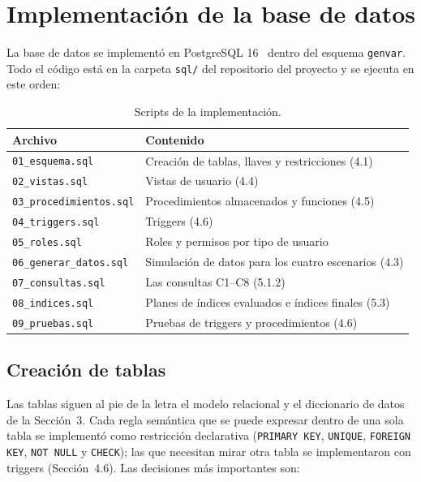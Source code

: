 
\section{Implementación de la base de datos}

La base de datos se implementó en PostgreSQL 16~\cite{postgres} dentro del esquema \texttt{genvar}. Todo el código está
en la carpeta \texttt{sql/} del repositorio del proyecto y se ejecuta en este orden:

\begin{table}[H]
\centering\small
\begin{tabular}{@{}ll@{}}
\toprule
Archivo & Contenido \\
\midrule
\texttt{01\_\allowbreak{}esquema.sql} & Creación de tablas, llaves y restricciones (4.1) \\
\texttt{02\_\allowbreak{}vistas.sql} & Vistas de usuario (4.4) \\
\texttt{03\_\allowbreak{}procedimientos.sql} & Procedimientos almacenados y funciones (4.5) \\
\texttt{04\_\allowbreak{}triggers.sql} & Triggers (4.6) \\
\texttt{05\_\allowbreak{}roles.sql} & Roles y permisos por tipo de usuario \\
\texttt{06\_\allowbreak{}generar\_\allowbreak{}datos.sql} & Simulación de datos para los cuatro escenarios (4.3) \\
\texttt{07\_\allowbreak{}consultas.sql} & Las consultas C1--C8 (5.1.2) \\
\texttt{08\_\allowbreak{}indices.sql} & Planes de índices evaluados e índices finales (5.3) \\
\texttt{09\_\allowbreak{}pruebas.sql} & Pruebas de triggers y procedimientos (4.6) \\
\bottomrule
\end{tabular}
\caption{Scripts de la implementación.}
\end{table}

\subsection{Creación de tablas}\label{sec:creacion}

Las tablas siguen al pie de la letra el modelo relacional y el diccionario de datos de la Sección~3.
Cada regla semántica que se puede expresar dentro de una sola tabla se implementó como restricción
declarativa (\texttt{PRIMARY KEY}, \texttt{UNIQUE}, \texttt{FOREIGN KEY}, \texttt{NOT NULL} y \texttt{CHECK});
las que necesitan mirar otra tabla se implementaron con triggers (Sección~4.6). Las decisiones más
importantes son:

